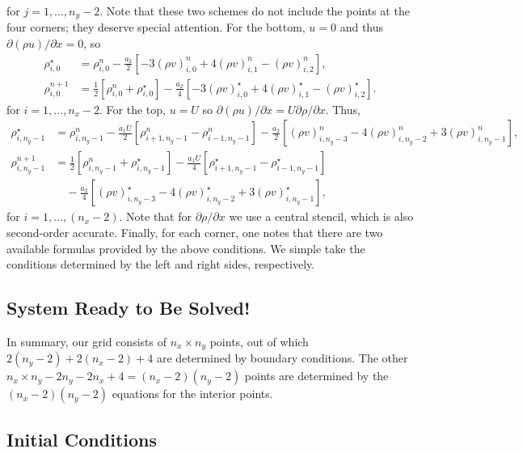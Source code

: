\documentclass[11pt]{article}
\newcommand{\ind}[4]{{#1}^{#2}_{#3,#4}}
\begin{document}
for $j = 1,\hdots,n_y-2$. Note that these two schemes do not include the points at the four corners; they deserve special attention. For the bottom, $u = 0$ and thus $\partial(\rho u)/\partial x = 0$, so
\begin{align}
\ind{\rho}{\star}{i}{0} &= \ind{\rho}{n}{i}{0} - \frac{a_2}{2}\left[ -3\ind{(\rho v)}{n}{i}{0} + 4\ind{(\rho v)}{n}{i}{1} - \ind{(\rho v)}{n}{i}{2} \right],\\
\ind{\rho}{n+1}{i}{0} &= \frac{1}{2}\left[\ind{\rho}{n}{i}{0} + \ind{\rho}{\star}{i}{0}\right] - \frac{a_2}{4}\left[ -3\ind{(\rho v)}{\star}{i}{0} + 4\ind{(\rho v)}{\star}{i}{1} - \ind{(\rho v)}{\star}{i}{2} \right].
\end{align}
for $i = 1,\hdots,n_x-2$. For the top, $u = U$ so $\partial(\rho u)/\partial x = U\partial \rho/\partial x$. Thus,
\begin{align}
\ind{\rho}{\star}{i}{n_y-1} &= \ind{\rho}{n}{i}{n_y-1} - \frac{a_1 U}{2}\left[\ind{\rho}{n}{i+1}{n_y-1} - \ind{\rho}{n}{i-1}{n_y-1}\right] - \frac{a_2}{2}\left[ \ind{(\rho v)}{n}{i}{n_y - 3} - 4\ind{(\rho v)}{n}{i}{n_y - 2} + 3\ind{(\rho v)}{n}{i}{n_y-1} \right],\\
\ind{\rho}{n+1}{i}{n_y-1} &= \frac{1}{2}\left[\ind{\rho}{n}{i}{n_y-1} + \ind{\rho}{\star}{i}{n_y-1} \right] - \frac{a_1 U}{4}\left[\ind{\rho}{\star}{i+1}{n_y-1} - \ind{\rho}{\star}{i-1}{n_y-1}\right]\\
&\quad- \frac{a_2}{4}\left[ \ind{(\rho v)}{\star}{i}{n_y - 3} - 4\ind{(\rho v)}{\star}{i}{n_y - 2} + 3\ind{(\rho v)}{\star}{i}{n_y-1} \right],
\end{align}
for $i = 1,\hdots,(n_x-2)$. Note that for $\partial\rho/\partial x$ we use a central stencil, which is also second-order accurate. Finally, for each corner, one notes that there are two available formulas provided by the above conditions.
We simple take the conditions determined by the left and right sides, respectively.

\subsection{System Ready to Be Solved!}

In summary, our grid consists of $n_x \times n_y$ points, out of which $2(n_y - 2) + 2(n_x -2) + 4$ are determined by boundary conditions. The other $n_x \times n_y - 2n_y - 2n_x + 4 = (n_x - 2)(n_y - 2)$ points are determined by the $(n_x - 2)(n_y - 2)$ equations for the interior points.

\subsection{Initial Conditions}
\end{document}
